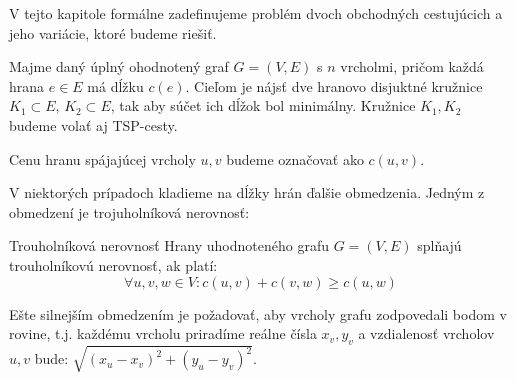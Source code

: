 V tejto kapitole formálne zadefinujeme problém dvoch obchodných cestujúcich
a jeho variácie, ktoré budeme riešiť.

\begin{definicia}
Majme daný úplný ohodnotený graf $G = (V, E)$ s $n$ vrcholmi, pričom každá hrana
$e \in E$ má dĺžku $c(e)$. Cieľom je nájsť dve hranovo disjuktné kružnice $K_1 \subset E$,
$K_2 \subset E$, tak aby súčet ich dĺžok bol minimálny. Kružnice $K_1, K_2$ budeme volať aj
TSP-cesty.
\end{definicia}

\begin{poznamka}
Cenu hranu spájajúcej vrcholy $u, v$ budeme označovať ako $c(u, v)$. 
\end{poznamka}

V niektorých prípadoch kladieme na dĺžky hrán ďalšie obmedzenia.
Jedným z obmedzení je trojuholníková nerovnosť:

\begin{definicia}{Trouholníková nerovnosť}
Hrany uhodnoteného grafu $G = (V, E)$ splňajú trouholníkovú nerovnosť, ak platí:
$$\forall u,v,w \in V: c(u,v) + c(v,w) \geq c(u,w)$$
\end{definicia}

Ešte silnejším obmedzením je požadovať, aby vrcholy grafu zodpovedali bodom v rovine, t.j.
každému vrcholu priradíme reálne čísla $x_v, y_v$ a vzdialenosť vrcholov $u, v$ bude:
$\sqrt{(x_u - x_v)^2 + (y_u - y_v)^2}$.
